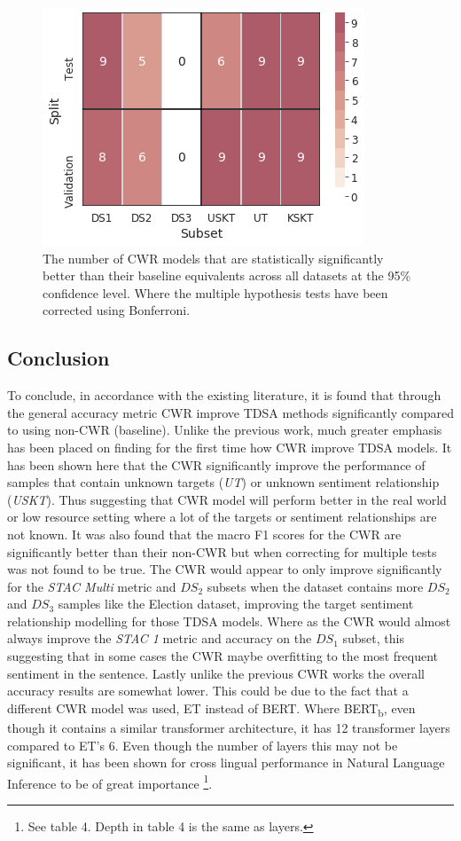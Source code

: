 \begin{figure}[!h]
    \centering
    \includegraphics[scale=0.5]{images/augmentation/methods_performance/CWR/cwr_combined_sig_error_splits.png}
    \caption{The number of CWR models that are statistically significantly better than their baseline equivalents across all datasets at the 95\% confidence level. Where the multiple hypothesis tests have been corrected using Bonferroni.}
    \label{fig:aug_cwr_combined_sig_error_splits}
\end{figure}

\subsection{Conclusion}
To conclude, in accordance with the existing literature, it is found that through the general accuracy metric CWR improve TDSA methods significantly compared to using non-CWR (baseline). Unlike the previous work, much greater emphasis has been placed on finding for the first time how CWR improve TDSA models. It has been shown here that the CWR significantly improve the performance of samples that contain unknown targets (\textit{UT}) or unknown sentiment relationship (\textit{USKT}). Thus suggesting that CWR model will perform better in the real world or low resource setting where a lot of the targets or sentiment relationships are not known. It was also found that the macro F1 scores for the CWR are significantly better than their non-CWR but when correcting for multiple tests was not found to be true. The CWR would appear to only improve significantly for the \textit{STAC Multi} metric and $DS_2$ subsets when the dataset contains more $DS_2$ and $DS_3$ samples like the Election dataset, improving the target sentiment relationship modelling for those TDSA models. Where as the CWR would almost always improve the \textit{STAC 1} metric and accuracy on the $DS_1$ subset, this suggesting that in some cases the CWR maybe overfitting to the most frequent sentiment in the sentence. Lastly unlike the previous CWR works the overall accuracy results are somewhat lower. This could be due to the fact that a different CWR model was used, ET instead of BERT. Where BERT\textsubscript{b}, even though it contains a similar transformer architecture, it has 12 transformer layers compared to ET's 6. Even though the number of layers this may not be significant, it has been shown for cross lingual performance in Natural Language Inference to be of great importance \citep{wang2019cross} \footnote{See table 4. Depth in table 4 is the same as layers.}. 

